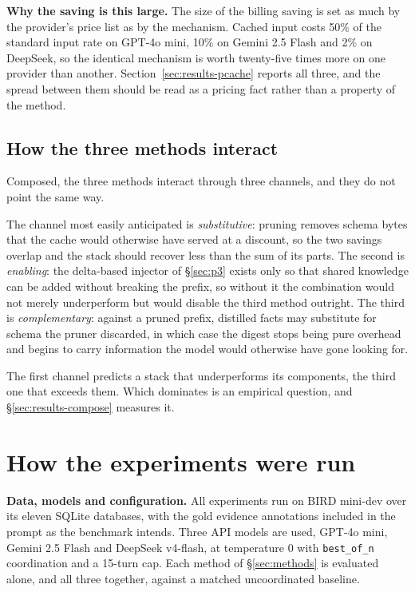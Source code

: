 \documentclass[conference]{IEEEtran}
\begin{document}
\textbf{Why the saving is this large.} The size of the billing saving is set as much by
the provider's price list as by the mechanism. Cached input costs 50\% of the
standard input rate on GPT-4o mini, 10\% on Gemini 2.5 Flash and 2\% on
DeepSeek, so the identical mechanism is worth twenty-five times more on one
provider than another. Section~\ref{sec:results-pcache} reports all three, and
the spread between them should be read as a pricing fact rather than a property
of the method.

\subsection{How the three methods interact}\label{sec:interact}

Composed, the three methods interact through three channels, and they do not
point the same way.

The channel most easily anticipated is \emph{substitutive}: pruning removes
schema bytes that the cache would otherwise have served at a discount, so the
two savings overlap and the stack should recover less than the sum of its parts.
The second is \emph{enabling}: the delta-based injector of §\ref{sec:p3} exists
only so that shared knowledge can be added without breaking the prefix, so
without it the combination would not merely underperform but would disable the
third method outright. The third is \emph{complementary}: against a pruned
prefix, distilled facts may substitute for schema the pruner discarded, in which
case the digest stops being pure overhead and begins to carry information the
model would otherwise have gone looking for.

The first channel predicts a stack that underperforms its components, the third
one that exceeds them. Which dominates is an empirical question, and
§\ref{sec:results-compose} measures it.

\section{How the experiments were run}\label{sec:setup}

\textbf{Data, models and configuration.} All experiments run on BIRD mini-dev
over its eleven SQLite databases, with the gold evidence annotations included in
the prompt as the benchmark intends. Three API models are used, GPT-4o mini,
Gemini 2.5 Flash and DeepSeek v4-flash, at temperature 0 with
\texttt{best\_of\_n} coordination and a 15-turn cap. Each method of
§\ref{sec:methods} is evaluated alone, and all three together, against a matched
uncoordinated baseline.
\end{document}
